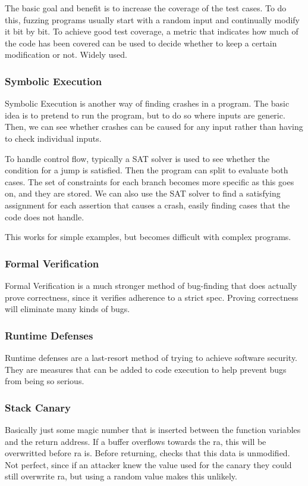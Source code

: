\documentclass{article}
\renewcommand{\tt}{\ttfamily \small}
\begin{document}
\begin{multicols*}{2}
The basic goal and benefit is to increase the coverage of the test cases. To do this, fuzzing programs usually start with a random input and continually modify it bit by bit. To achieve good test coverage, a metric that indicates how much of the code has been covered can be used to decide whether to keep a certain modification or not. Widely used. 

\subsubsection{Symbolic Execution}
Symbolic Execution is another way of finding crashes in a program. The basic idea is to pretend to run the program, but to do so where inputs are generic. Then, we can see whether crashes can be caused for any input rather than having to check individual inputs. 

To handle control flow, typically a SAT solver is used to see whether the condition for a jump is satisfied. Then the program can split to evaluate both cases. The set of constraints for each branch becomes more specific as this goes on, and they are stored. We can also use the SAT solver to find a satisfying assignment for each assertion that causes a crash, easily finding cases that the code does not handle. 

This works for simple examples, but becomes difficult with complex programs. 

\subsubsection{Formal Verification}
Formal Verification is a much stronger method of bug-finding that does actually prove correctness, since it verifies adherence to a strict spec. Proving correctness will eliminate many kinds of bugs. 


\subsubsection{Runtime Defenses}
Runtime defenses are a last-resort method of trying to achieve software security. They are measures that can be added to code execution to help prevent bugs from being so serious. 

\subsubsection{Stack Canary}
Basically just some magic number that is inserted between the function variables and the return address. If a buffer overflows towards the {\tt ra}, this will be overwritted before {\tt ra} is. Before returning, checks that this data is unmodified. Not perfect, since if an attacker knew the value used for the canary they could still overwrite {\tt ra}, but using a random value makes this unlikely.


\end{multicols*}
\end{document}
